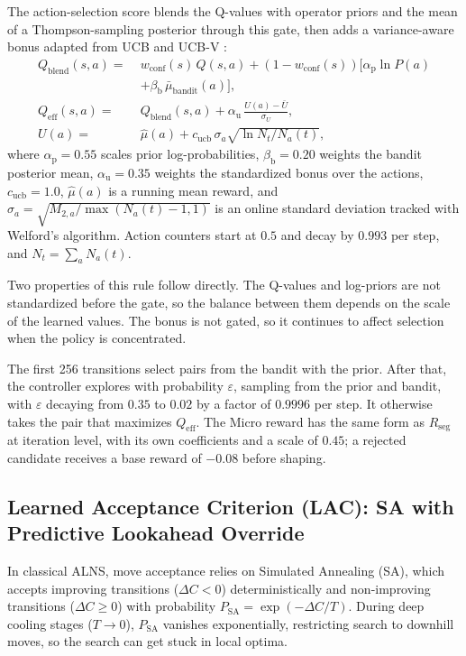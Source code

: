 \documentclass{ieeeaccess}
\begin{document}
The action-selection score blends the Q-values with operator priors and the mean of a Thompson-sampling posterior through this gate, then adds a variance-aware bonus adapted from UCB \cite{auer2002finite} and UCB-V \cite{audibert2009exploration}:
\begin{align}
  Q_{\text{blend}}(s, a) = \; &w_{\text{conf}}(s)\,Q(s, a) + (1 - w_{\text{conf}}(s))\big[ \alpha_{\text{p}}\ln P(a) \nonumber \\
  &+ \beta_{\text{b}}\,\bar{\mu}_{\text{bandit}}(a) \big], \nonumber \\
  Q_{\text{eff}}(s, a) = \; &Q_{\text{blend}}(s, a) + \alpha_{\text{u}}\,\frac{U(a) - \bar{U}}{\sigma_U}, \nonumber \\
  U(a) = \; &\hat{\mu}(a) + c_{\text{ucb}}\,\sigma_a \sqrt{\ln N_t / N_a(t)},
  \label{eq:q_eff_blending}
\end{align}
where $\alpha_{\text{p}} = 0.55$ scales prior log-probabilities, $\beta_{\text{b}} = 0.20$ weights the bandit posterior mean, $\alpha_{\text{u}} = 0.35$ weights the standardized bonus over the actions, $c_{\text{ucb}} = 1.0$, $\hat{\mu}(a)$ is a running mean reward, and $\sigma_a = \sqrt{M_{2, a}/\max(N_a(t) - 1, 1)}$ is an online standard deviation tracked with Welford's algorithm. Action counters start at $0.5$ and decay by $0.993$ per step, and $N_t = \sum_a N_a(t)$.

Two properties of this rule follow directly. The Q-values and log-priors are not standardized before the gate, so the balance between them depends on the scale of the learned values. The bonus is not gated, so it continues to affect selection when the policy is concentrated.

The first 256 transitions select pairs from the bandit with the prior. After that, the controller explores with probability $\varepsilon$, sampling from the prior and bandit, with $\varepsilon$ decaying from $0.35$ to $0.02$ by a factor of $0.9996$ per step. It otherwise takes the pair that maximizes $Q_{\text{eff}}$. The Micro reward has the same form as $R_{\text{seg}}$ at iteration level, with its own coefficients and a scale of $0.45$; a rejected candidate receives a base reward of $-0.08$ before shaping.

\subsection{Learned Acceptance Criterion (LAC): SA with Predictive Lookahead Override}
\label{sec:lac}

In classical ALNS, move acceptance relies on Simulated Annealing (SA), which accepts improving transitions ($\Delta C < 0$) deterministically and non-improving transitions ($\Delta C \ge 0$) with probability $P_{\text{SA}} = \exp(-\Delta C / T)$. During deep cooling stages ($T \to 0$), $P_{\text{SA}}$ vanishes exponentially, restricting search to downhill moves, so the search can get stuck in local optima.
\end{document}
